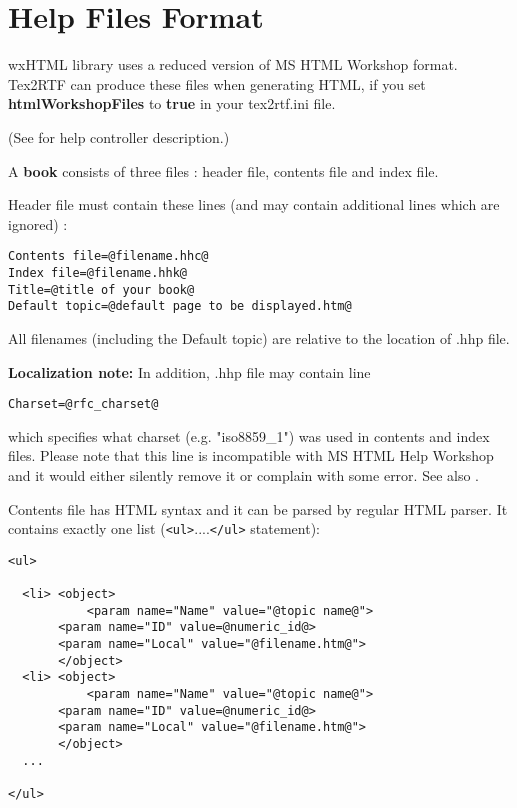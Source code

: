 \section{Help Files Format}\label{helpformat}

wxHTML library uses a reduced version of MS HTML Workshop format.
Tex2RTF can produce these files when generating HTML, if you set {\bf htmlWorkshopFiles} to {\bf true} in
your tex2rtf.ini file.

(See  for help controller description.)

A {\bf book} consists of three files : header file, contents file and index file.


Header file must contain these lines (and may contain additional lines which are ignored) :

\begin{verbatim}
Contents file=@filename.hhc@
Index file=@filename.hhk@
Title=@title of your book@
Default topic=@default page to be displayed.htm@
\end{verbatim}

All filenames (including the Default topic) are relative to the 
location of .hhp file.

{\bf Localization note:} In addition, .hhp file may contain line

\begin{verbatim}
Charset=@rfc_charset@
\end{verbatim}

which specifies what charset (e.g. "iso8859_1") was used in contents
and index files. Please note that this line is incompatible with
MS HTML Help Workshop and it would either silently remove it or complain
with some error. See also 
.


Contents file has HTML syntax and it can be parsed by regular HTML parser. It contains exactly one list
(\verb$<ul>$....\verb$</ul>$ statement):

\begin{verbatim}
<ul>

  <li> <object>
           <param name="Name" value="@topic name@">
	   <param name="ID" value=@numeric_id@>
	   <param name="Local" value="@filename.htm@">
       </object>
  <li> <object>
           <param name="Name" value="@topic name@">
	   <param name="ID" value=@numeric_id@>
	   <param name="Local" value="@filename.htm@">
       </object>
  ...    

</ul>
\end{verbatim}

